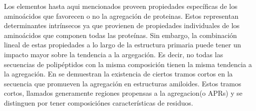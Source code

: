 



Los elementos hasta aqui mencionados proveen propiedades específicas de los aminoácidos que favorecen o no la agregación de proteinas.
Estos representan determinantes intrínsecos ya que provienen de propiedades individuales de los aminoácidos que componen todas las proteínas.
Sin embargo, la combinación lineal de estas propiedades a lo largo de la estructura primaria puede tener un impacto mayor sobre la tendencia a la argegación.
Es decir, no todas las secuencias de polipéptidos con la misma composición tienen la misma tendencia a la agregación.
En \cite{ventura2004short} se demuestran la existencia de ciertos tramos cortos en la secuencia que promueven la agregación en estructuras amiloides.
Estos tramos cortos, llamados generamente regiones propensas a la agregacion(o APRs) y se distinguen por tener composiciónes características de residuos.


